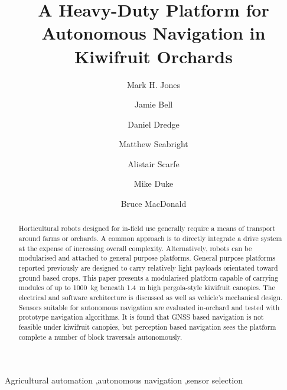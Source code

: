 \documentclass[preprint,authoryear,12pt]{elsarticle}
\begin{document}
\begin{frontmatter}

\title{A Heavy-Duty Platform for Autonomous Navigation in Kiwifruit Orchards}

\author[UoW]{Mark H. Jones}

\author[UoA]{Jamie Bell}
\author[UoW]{Daniel Dredge}
\author[UoW]{Matthew Seabright}
\author[RPL]{Alistair Scarfe}
\author[UoW]{Mike Duke}
\author[UoA]{Bruce MacDonald}

\address[UoW]{School of Engineering, University of Waikato, Hamilton, New Zealand}
\address[UoA]{Faculty of Engineering, University of Auckland, Auckland, New Zealand}
\address[RPL]{Robotics Plus Ltd, Newnham Innovation Park, Tauranga, New Zealand}

\begin{abstract}
    Horticultural robots designed for in-field use generally require a means of transport around farms or orchards.
    A common approach is to directly integrate a drive system at the expense of increasing overall complexity.
    Alternatively, robots can be modularised and attached to general purpose platforms.
    General purpose platforms reported previously are designed to carry relatively light payloads orientated toward ground based crops.
    This paper presents a modularised platform capable of carrying modules of up to \SI{1000}{\kilo\gram} beneath \SI{1.4}{\meter} high pergola-style kiwifruit canopies.
    The electrical and software architecture is discussed as well as vehicle's mechanical design.
    Sensors suitable for autonomous navigation are evaluated in-orchard and tested with prototype navigation algorithms.
    It is found that GNSS based navigation is not feasible under kiwifruit canopies, but perception based navigation sees the platform complete a number of block traversals autonomously.


\end{abstract}

\begin{keyword}
    Agricultural automation \sep autonomous navigation \sep sensor selection
\end{keyword}

\end{frontmatter}

\linenumbers
\end{document}
